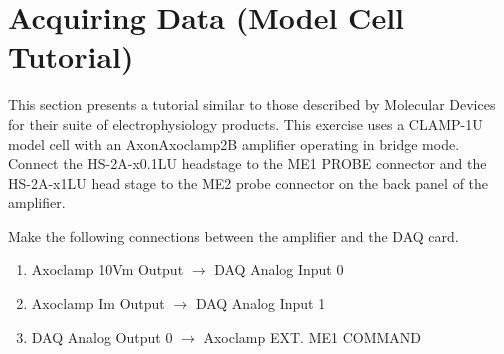 \section{Acquiring Data (Model Cell Tutorial)}

This section presents a tutorial similar to those described by Molecular Devices for their suite of electrophysiology products. This exercise uses a CLAMP-1U model cell with an Axon\tm Axoclamp\tm 2B amplifier operating in bridge mode. Connect the HS-2A-x0.1LU headstage to the ME1 PROBE connector and the HS-2A-x1LU head stage to the ME2 probe connector on the back panel of the amplifier.

 Make the following connections between the amplifier and the DAQ card. 
\begin{enumerate}
\item Axoclamp 10Vm Output $\rightarrow$ DAQ Analog Input 0
\item Axoclamp Im Output $\rightarrow$ DAQ Analog Input 1
\item DAQ Analog Output 0 $\rightarrow$ Axoclamp EXT. ME1 COMMAND
\end{enumerate}

